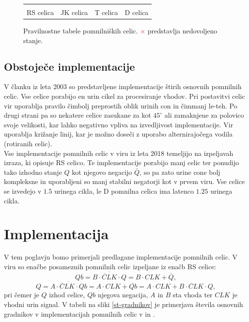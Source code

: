 \documentclass[a4paper, 11pt]{article}
\begin{document}
\begin{figure}[h]
\begin{tabular}{cccc}
		\\ \\
		RS celica & JK celica & T celica & D celica \\
	\end{tabular}
	\caption{Pravilnostne tabele pomnilniških celic. \textcolor{Red}{$\times$} predstavlja nedovoljeno stanje.}
	\label{tab-cells-table}
\end{figure}


\subsection{Obstoječe implementacije}

V članku \cite{quantum_dot} iz leta 2003 so predstavljene implementacije štirih osnovnih pomnilnih celic. Vse celice porabijo en urin cikel za procesiranje vhodov. Pri postavitvi celic vir uporablja pravilo čimbolj preprostih oblik urinih con in čimmanj le-teh. Po drugi strani pa so nekatere celice zasukane za kot $ 45^{\circ} $ ali zamaknjene za polovico svoje velikosti, kar lahko negativno vpliva na izvedljivost implementacije. Vir uporablja križanje linij, kar je možno doseči z uporabo alternirajočega vodila (rotiranih celic). \\

Vse implementacije pomnilnih celic v viru \cite{a_novel_approach} iz leta 2018 temeljijo na izpeljavah izraza, ki opisuje RS celico. Te implementacije porabijo manj celic ter ponudijo tako izhodno stanje $Q$ kot njegovo negacijo $\bar{Q}$, so pa zato urine cone bolj kompleksne in uporabljeni so manj stabilni negatorji kot v prvem viru. Vse celice se izvedejo v $1.5$ urinega cikla, le D pomnilna celica ima latenco $1.25$ urinega cikla.



\section{Implementacija}

V tem poglavju bomo primerjali predlagane implementacije pomnilnih celic.
V viru \cite{a_novel_approach} so enačbe posameznih pomnilnih celic izpeljane iz enačb RS celice:
\begin{equation}
Qb = \overline{\overline{B \cdot CLK} \cdot Q} = B \cdot CLK + \overline{Q},
\label{eq-rs-qb}
\end{equation}
\begin{equation}
Q = \overline{\overline{A \cdot CLK} \cdot Qb} = A \cdot CLK + \overline{Qb} = A \cdot CLK + \overline{B \cdot CLK} \cdot Q,
\label{eq-rs-q}
\end{equation}
pri čemer je $Q$ izhod celice, $Qb$ njegova negacija, $A$ in $B$ sta vhoda ter $CLK$ je vhodni urin signal.
V tabeli na sliki \ref{st-gradnikov} je primerjava števila osnovnih gradnikov v implementacijah pomnilnih celic v \cite{a_novel_approach} in \cite{quantum_dot}.
\end{document}
